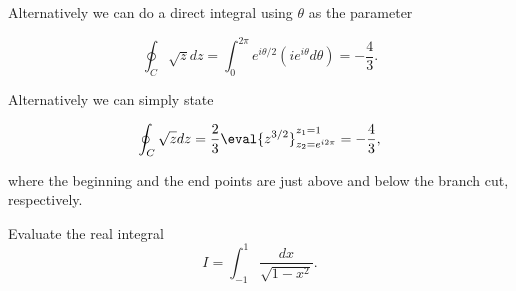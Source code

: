 \documentclass[english,a4paper,12pt]{report}
\begin{document}
{Alternatively we can do a direct integral using \(\theta \) as the parameter 

\begin{equation}
    \oint_{C} \sqrt{z}dz = \int_{0}^{2\pi } e^{i \theta /2} (i e^{i \theta }d \theta  ) = -\frac{4}{3}.     
\end{equation}

Alternatively we can simply state

\begin{equation}
    \oint_{C} \sqrt{z}dz = \frac{2}{3} \eval{z^{3 /2} }_{z_2 = e^{i 2\pi } }^{z_1 = 1 } = -\frac{4}{3},
\end{equation}

where the beginning and the end points are just above and below the branch cut, respectively.
}

{Evaluate the real integral
\begin{equation}
  I=\int_{-1}^{1}\frac{dx}{\sqrt{1 - x^{2}}}.
\end{equation}
}
\end{document}
